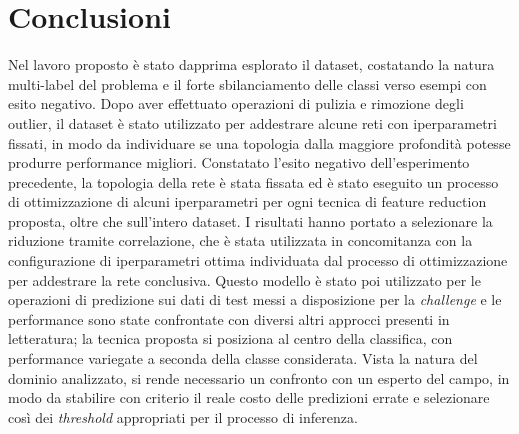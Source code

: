 \section{Conclusioni}
Nel lavoro proposto è stato dapprima esplorato il dataset, costatando la natura multi-label del problema e il forte sbilanciamento delle classi verso esempi con esito negativo. Dopo aver effettuato operazioni di pulizia e rimozione degli outlier, il dataset è stato utilizzato per addestrare alcune reti con iperparametri fissati, in modo da individuare se una topologia dalla maggiore profondità potesse produrre performance migliori. Constatato l'esito negativo dell'esperimento precedente, la topologia della rete è stata fissata ed è stato eseguito un processo di ottimizzazione di alcuni iperparametri per ogni tecnica di feature reduction proposta, oltre che sull'intero dataset. I risultati hanno portato a selezionare la riduzione tramite correlazione, che è stata utilizzata in concomitanza con la configurazione di iperparametri ottima individuata dal processo di ottimizzazione per addestrare la rete conclusiva. Questo modello è stato poi utilizzato per le operazioni di predizione sui dati di test messi a disposizione per la \textit{challenge} e le performance sono state confrontate con diversi altri approcci presenti in letteratura; la tecnica proposta si posiziona al centro della classifica, con performance variegate a seconda della classe considerata. Vista la natura del dominio analizzato, si rende necessario un confronto con un esperto del campo, in modo da stabilire con criterio il reale costo delle predizioni errate e selezionare così dei \textit{threshold} appropriati per il processo di inferenza.